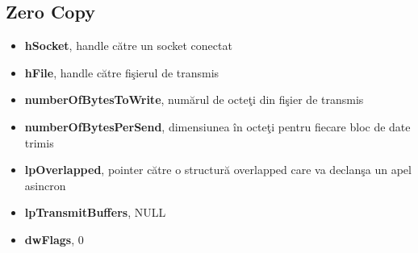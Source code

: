 \documentclass{refcard.cs.pub.ro}
\begin{document}
\begin{multicols*}{3}
\subsection{Zero Copy}
\begin{itemize}
\item \textbf{hSocket}, handle către un socket conectat
\item \textbf{hFile}, handle către fişierul de transmis
\item \textbf{numberOfBytesToWrite}, numărul de octeţi din fişier de transmis
\item \textbf{numberOfBytesPerSend}, dimensiunea în octeţi pentru fiecare bloc de date trimis
\item \textbf{lpOverlapped}, pointer către o structură overlapped care va declanşa un apel asincron
\item \textbf{lpTransmitBuffers}, NULL
\item \textbf{dwFlags}, 0
\end{itemize}

\end{multicols*}
\end{document}
